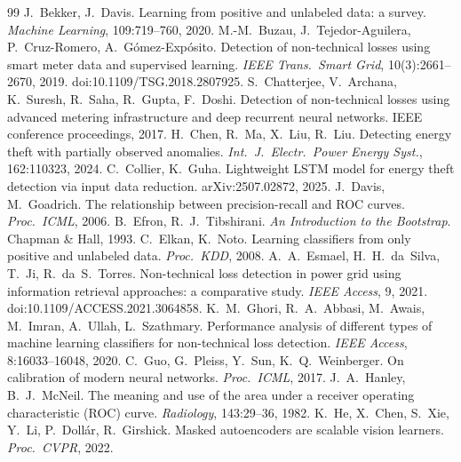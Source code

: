 \documentclass[11pt,a4paper]{article}
\theoremstyle{plain}
\theoremstyle{definition}
\theoremstyle{remark}
\begin{document}
\begin{thebibliography}{99}\small
{} J.~Bekker, J.~Davis. Learning from positive and unlabeled data: a survey. \emph{Machine Learning}, 109:719--760, 2020.
 M.-M.~Buzau, J.~Tejedor-Aguilera, P.~Cruz-Romero, A.~G\'omez-Exp\'osito. Detection of non-technical losses using smart meter data and supervised learning. \emph{IEEE Trans.\ Smart Grid}, 10(3):2661--2670, 2019. doi:10.1109/TSG.2018.2807925.
 S.~Chatterjee, V.~Archana, K.~Suresh, R.~Saha, R.~Gupta, F.~Doshi. Detection of non-technical losses using advanced metering infrastructure and deep recurrent neural networks. IEEE conference proceedings, 2017.
 H.~Chen, R.~Ma, X.~Liu, R.~Liu. Detecting energy theft with partially observed anomalies. \emph{Int.\ J.\ Electr.\ Power Energy Syst.}, 162:110323, 2024.
 C.~Collier, K.~Guha. Lightweight LSTM model for energy theft detection via input data reduction. arXiv:2507.02872, 2025.
 J.~Davis, M.~Goadrich. The relationship between precision-recall and ROC curves. \emph{Proc.\ ICML}, 2006.
 B.~Efron, R.~J.~Tibshirani. \emph{An Introduction to the Bootstrap}. Chapman \& Hall, 1993.
 C.~Elkan, K.~Noto. Learning classifiers from only positive and unlabeled data. \emph{Proc.\ KDD}, 2008.
 A.~A.~Esmael, H.~H.~da~Silva, T.~Ji, R.~da~S.~Torres. Non-technical loss detection in power grid using information retrieval approaches: a comparative study. \emph{IEEE Access}, 9, 2021. doi:10.1109/ACCESS.2021.3064858.
 K.~M.~Ghori, R.~A.~Abbasi, M.~Awais, M.~Imran, A.~Ullah, L.~Szathmary. Performance analysis of different types of machine learning classifiers for non-technical loss detection. \emph{IEEE Access}, 8:16033--16048, 2020.
 C.~Guo, G.~Pleiss, Y.~Sun, K.~Q.~Weinberger. On calibration of modern neural networks. \emph{Proc.\ ICML}, 2017.
 J.~A.~Hanley, B.~J.~McNeil. The meaning and use of the area under a receiver operating characteristic (ROC) curve. \emph{Radiology}, 143:29--36, 1982.
 K.~He, X.~Chen, S.~Xie, Y.~Li, P.~Doll\'ar, R.~Girshick. Masked autoencoders are scalable vision learners. \emph{Proc.\ CVPR}, 2022.

\end{thebibliography}
\end{document}
